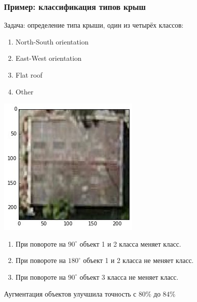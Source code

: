 \documentclass[fleqn, xcolor=x11names]{beamer}
\begin{document}
\begin{frame}[fragile]\frametitle{Пример: классификация типов крыш}
Задача: определение типа крыши, один из четырёх классов:

\hfill

\begin{minipage}{0.49\linewidth}
\begin{enumerate}
\item North-South orientation

\item East-West orientation

\item Flat roof

\item Other
\end{enumerate}
\end{minipage}
\begin{minipage}{0.49\linewidth}
{\includegraphics[scale=0.3]{images/roof.png}}
\end{minipage}

\hfill

\begin{enumerate}
\item При повороте на $90^\circ$ объект 1 и 2 класса меняет класс.

\item При повороте на $180^\circ$ объект 1 и 2 класса не меняет класс.

\item При повороте на $90^\circ$ объект 3 класса не меняет класс.
\end{enumerate}

\hfill

Аугментация объектов улучшила точность с $80\%$ до $84\%$
\end{frame}
\end{document}
